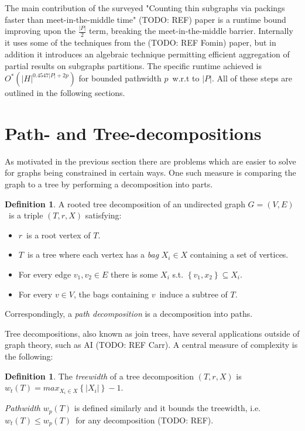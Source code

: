 \documentclass[a4paper,11pt,notitlepage]{report}
\theoremstyle{plain}
\theoremstyle{definition}
\newtheorem{defn}[thm]{Definition} %
\begin{document}
The main contribution of the surveyed "Counting thin subgraphs via packings faster than meet-in-the-middle time" (TODO: REF) paper
is a runtime bound improving upon the $\frac{|P|}{2}$ term, breaking the meet-in-the-middle barrier.
Internally it uses some of the techniques from the (TODO: REF Fomin) paper, but in addition it introduces an algebraic technique
permitting efficient aggregation of partial results on subgraphs partitions.
The specific runtime achieved is $O^*(|H|^{0.4547|P| + 2p})$ for bounded pathwidth $p$ w.r.t to $|P|$.
All of these steps are outlined in the following sections.


\section{Path- and Tree-decompositions}
As motivated in the previous section there are problems which are easier to solve for graphs being constrained in certain ways.
One such measure is comparing the graph to a tree by performing a decomposition into parts.

\begin{defn}
A rooted tree decomposition of an undirected graph $G = (V, E)$ is a triple $(T, r, X)$ satisfying:
\begin{itemize}
\item $r$ is a root vertex of $T$.
\item $T$ is a tree where each vertex has a \emph{bag} $X_i \in X$ containing a set of vertices.
\item For every edge ${v_1, v_2} \in E$ there is some $X_i$ s.t. $\left\{v_1, x_2\right\} \subseteq X_i$.
\item For every $v \in V$, the bags containing $v$ induce a subtree of $T$.
\end{itemize}
\end{defn}

Correspondingly, a \emph{path decomposition} is a decomposition into paths.

Tree decompositions, also known as join trees, have several applications outside of graph theory, such as AI (TODO: REF Carr).
A central measure of complexity is the following:

\begin{defn}
The \emph{treewidth} of a tree decomposition $(T, r, X)$ is $w_t(T) = max_{X_i \in X} \left\{ |X_i| \right\} - 1$.
\end{defn}

\emph{Pathwidth} $w_p(T)$ is defined similarly and it bounds the treewidth, i.e. $w_t(T) \leq w_p(T)$ for any decomposition (TODO: REF).
\end{document}
